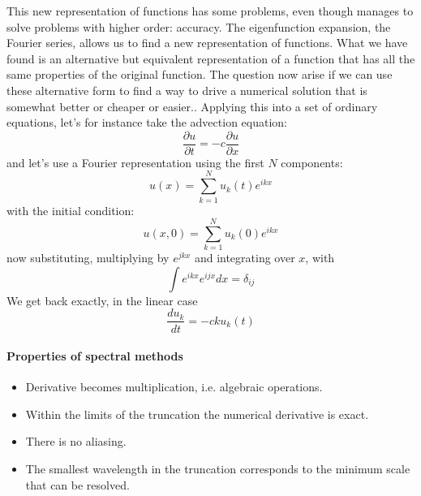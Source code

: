This new representation of functions has some problems, even though manages to solve problems with higher order: accuracy. The eigenfunction expansion, the Fourier series, allows us to find a new representation of functions. What we have found is an alternative but equivalent representation of a function that has all the same properties of the original function. The question now arise if we can use these alternative form to find a way to drive a numerical solution that is somewhat better or cheaper or easier.. Applying this into a set of ordinary equations, let's for instance take the advection equation:
$$ \frac{\partial u}{\partial t}=-c\frac{\partial u}{\partial x} $$
and let's use a Fourier representation using the first $N$ components:
\begin{equation}\label{eq.u(x)}
	u(x)=\displaystyle\sum_{k=1}^Nu_k(t)e^{ikx}
\end{equation} with the initial condition:
\begin{equation}\label{eq.u(x,0)}
	u(x,0)=\displaystyle\sum_{k=1}^Nu_k(0)e^{ikx}
\end{equation}
now substituting, multiplying by $e^{jkx}$ and integrating  over $x$, with $$\int e^{ikx}e^{ijx}dx=\delta_{ij}$$
We get back exactly, in the linear case
\begin{equation}
	\frac{du_k}{dt}=-cku_k(t)
\end{equation}
\paragraph{Properties of spectral methods}
\begin{itemize}
	\item Derivative becomes multiplication, i.e. algebraic operations.
	\item Within the limits of the truncation the numerical derivative is exact.
	\item There is no aliasing.
	\item The smallest wavelength in the truncation corresponds to the minimum scale that can be resolved.
\end{itemize}
